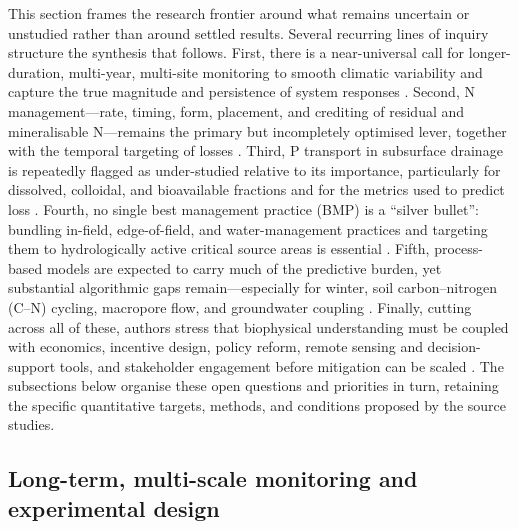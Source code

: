 \documentclass[11pt]{article}
\begin{document}
This section frames the research frontier around what remains uncertain or unstudied rather than around settled results. Several recurring lines of inquiry structure the synthesis that follows. First, there is a near-universal call for longer-duration, multi-year, multi-site monitoring to smooth climatic variability and capture the true magnitude and persistence of system responses \parencite{Randall2003,Randall2005,Waring2024,Jeong2018,Cooke2012,Kokulan2019,RANDALL1995}. Second, N management---rate, timing, form, placement, and crediting of residual and mineralisable N---remains the primary but incompletely optimised lever, together with the temporal targeting of losses \parencite{Christianson2015b,Bandura2025,Liu2021,ROSSI1991,Zhao2000}. Third, P transport in subsurface drainage is repeatedly flagged as under-studied relative to its importance, particularly for dissolved, colloidal, and bioavailable fractions and for the metrics used to predict loss \parencite{Hertzberger2019,Yuan2022,deOliveira2022,Sharpley1995,Christianson2016}. Fourth, no single best management practice (BMP) is a ``silver bullet'': bundling in-field, edge-of-field, and water-management practices and targeting them to hydrologically active critical source areas is essential \parencite{Sunohara2016,Lenhart2016,Christianson2014,Baulch2019}. Fifth, process-based models are expected to carry much of the predictive burden, yet substantial algorithmic gaps remain---especially for winter, soil carbon--nitrogen (C--N) cycling, macropore flow, and groundwater coupling \parencite{Du2017,SKAGGS1994,Dietzel2016,Feyereisen2006b}. Finally, cutting across all of these, authors stress that biophysical understanding must be coupled with economics, incentive design, policy reform, remote sensing and decision-support tools, and stakeholder engagement before mitigation can be scaled \parencite{Liu2021,Kvítek2023,David2015,Ferin2023,Khanal2020}. The subsections below organise these open questions and priorities in turn, retaining the specific quantitative targets, methods, and conditions proposed by the source studies.

\subsection{Long-term, multi-scale monitoring and experimental design}
\end{document}
